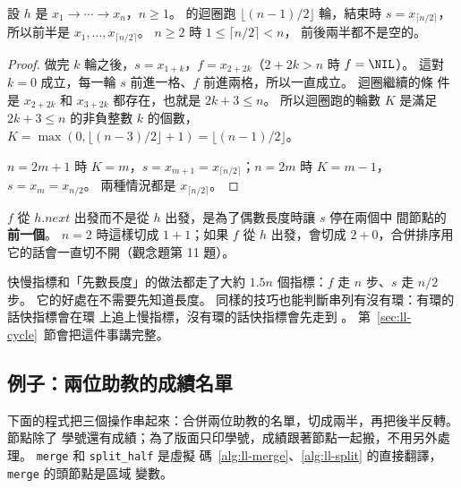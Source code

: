 \begin{theorem}
\label{thm:ll-split}
設 $h$ 是 $x_1 \to \cdots \to x_n$，$n \ge 1$。  的迴圈跑
$\lfloor (n-1)/2 \rfloor$ 輪，結束時 $s = x_{\lceil n/2 \rceil}$，所以前半是
$x_1, \ldots, x_{\lceil n/2 \rceil}$。 $n \ge 2$ 時 $1 \le \lceil n/2 \rceil < n$，
前後兩半都不是空的。
\end{theorem}

\begin{proof}
做完 $k$ 輪之後，$s = x_{1+k}$，$f = x_{2+2k}$（$2 + 2k > n$ 時 $f = \NIL$）。
這對 $k = 0$ 成立，每一輪 $s$ 前進一格、$f$ 前進兩格，所以一直成立。 迴圈繼續的條
件是 $x_{2+2k}$ 和 $x_{3+2k}$ 都存在，也就是 $2k + 3 \le n$。 所以迴圈跑的輪數
$K$ 是滿足 $2k + 3 \le n$ 的非負整數 $k$ 的個數，$K = \max(0, \lfloor (n-3)/2 \rfloor
+ 1) = \lfloor (n-1)/2 \rfloor$。

$n = 2m + 1$ 時 $K = m$，$s = x_{m+1} = x_{\lceil n/2 \rceil}$；$n = 2m$ 時
$K = m - 1$，$s = x_m = x_{n/2}$。 兩種情況都是 $x_{\lceil n/2 \rceil}$。
\end{proof}

$f$ 從 $h.\mathit{next}$ 出發而不是從 $h$ 出發，是為了偶數長度時讓 $s$ 停在兩個中
間節點的\textbf{前一個}。 $n = 2$ 時這樣切成 $1 + 1$；如果 $f$ 從 $h$ 出發，會切成
$2 + 0$，合併排序用它的話會一直切不開（觀念題第 11 題）。

快慢指標和「先數長度」的做法都走了大約 $1.5n$ 個指標：$f$ 走 $n$ 步、$s$ 走 $n/2$
步。 它的好處在不需要先知道長度。 同樣的技巧也能判斷串列有沒有環：有環的話快指標會在環
上追上慢指標，沒有環的話快指標會先走到 \NIL。 第~\ref{sec:ll-cycle}~節會把這件事講完整。

\subsection{例子：兩位助教的成績名單}

下面的程式把三個操作串起來：合併兩位助教的名單，切成兩半，再把後半反轉。 節點除了
學號還有成績；為了版面只印學號，成績跟著節點一起搬，不用另外處理。 \texttt{merge} 和 \texttt{split\_half} 是虛擬
碼~\ref{alg:ll-merge}、\ref{alg:ll-split} 的直接翻譯，\texttt{merge} 的頭節點是區域
變數。

